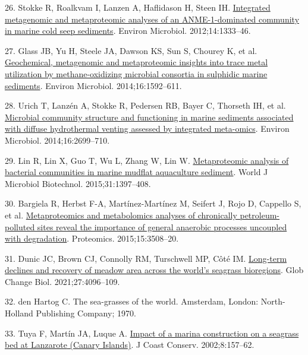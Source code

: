 \documentclass[
  12 pt,
]{article}
\newlength{\cslhangindent}
\newlength{\cslentryspacingunit} %
\newenvironment{CSLReferences}[2] %
 {%
  \setlength{\parindent}{0pt}
  \ifodd #1
  \let\oldpar\par
  \def\par{\hangindent=\cslhangindent\oldpar}
  \fi
  \setlength{\parskip}{#2\cslentryspacingunit}
 }%
 {}
\begin{document}
\begin{CSLReferences}{0}{0}
\leavevmode{}%
26. Stokke R, Roalkvam I, Lanzen A, Haflidason H, Steen IH. \href{https://doi.org/10.1111/j.1462-2920.2012.02716.x}{Integrated metagenomic and metaproteomic analyses of an {ANME-1-dominated} community in marine cold seep sediments}. Environ Microbiol. 2012;14:1333--46.

\leavevmode{}%
27. Glass JB, Yu H, Steele JA, Dawson KS, Sun S, Chourey K, et al. \href{https://doi.org/10.1111/1462-2920.12314}{Geochemical, metagenomic and metaproteomic insights into trace metal utilization by methane-oxidizing microbial consortia in sulphidic marine sediments}. Environ Microbiol. 2014;16:1592--611.

\leavevmode{}%
28. Urich T, Lanzén A, Stokke R, Pedersen RB, Bayer C, Thorseth IH, et al. \href{https://doi.org/10.1111/1462-2920.12283}{Microbial community structure and functioning in marine sediments associated with diffuse hydrothermal venting assessed by integrated meta-omics}. Environ Microbiol. 2014;16:2699--710.

\leavevmode{}%
29. Lin R, Lin X, Guo T, Wu L, Zhang W, Lin W. \href{https://doi.org/10.1007/s11274-015-1891-5}{Metaproteomic analysis of bacterial communities in marine mudflat aquaculture sediment}. World J Microbiol Biotechnol. 2015;31:1397--408.

\leavevmode{}%
30. Bargiela R, Herbst F-A, Martínez-Martínez M, Seifert J, Rojo D, Cappello S, et al. \href{https://doi.org/10.1002/pmic.201400614}{Metaproteomics and metabolomics analyses of chronically petroleum-polluted sites reveal the importance of general anaerobic processes uncoupled with degradation}. Proteomics. 2015;15:3508--20.

\leavevmode{}%
31. Dunic JC, Brown CJ, Connolly RM, Turschwell MP, Côté IM. \href{https://doi.org/10.1111/gcb.15684}{Long-term declines and recovery of meadow area across the world's seagrass bioregions}. Glob Change Biol. 2021;27:4096--109.

\leavevmode{}%
32. den Hartog C. The sea-grasses of the world. Amsterdam, London: North-Holland Publishing Company; 1970.

\leavevmode{}%
33. Tuya F, Martín JA, Luque A. \href{https://doi.org/10.1652/1400-0350(2002)008\%5B0157:IOAMCO\%5D2.0.CO;2}{Impact of a marina construction on a seagrass bed at {Lanzarote} ({Canary Islands})}. J Coast Conserv. 2002;8:157--62.


\end{CSLReferences}
\end{document}
